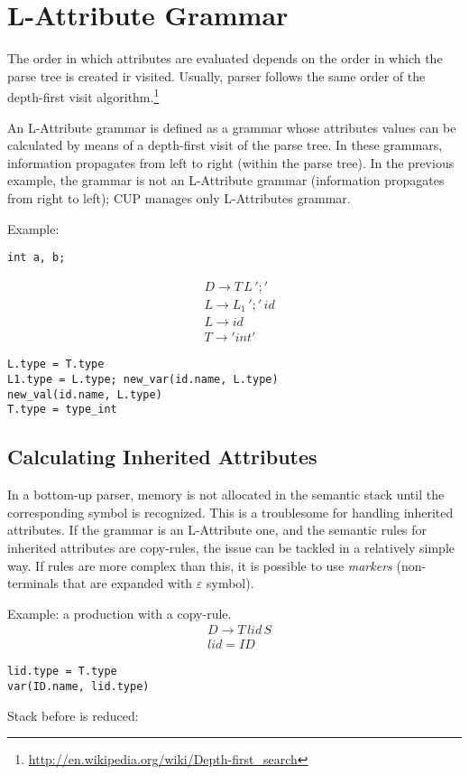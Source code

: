 \section{L-Attribute Grammar}
The order in which attributes are evaluated depends on the order in which the parse tree is created ir visited.
Usually, parser follows the same order of the depth-first visit algorithm.\footnote{\url{http://en.wikipedia.org/wiki/Depth-first_search}}

An L-Attribute grammar is defined as a grammar whose attributes values can be calculated by means of a depth-first visit of the parse tree.
In these grammars, information propagates from left to right (within the parse tree).
In the previous example, the grammar is not an L-Attribute grammar (information propagates from right to left); CUP manages only L-Attributes grammar.

Example:
\begin{lstlisting}
int a, b;
\end{lstlisting}
\begin{align*}
& D \to T \, L \, ';' \\
& L \to L_1 \, ';' \, id \\
& L \to id \\
& T \to 'int'
\end{align*}
\begin{lstlisting}
L.type = T.type
L1.type = L.type; new_var(id.name, L.type)
new_val(id.name, L.type)
T.type = type_int
\end{lstlisting}

\subsection{Calculating Inherited Attributes}
In a bottom-up parser, memory is not allocated in the semantic stack until the corresponding symbol is recognized.
This is a troublesome for handling inherited attributes.
If the grammar is an L-Attribute one, and the semantic rules for inherited attributes are copy-rules, the issue can be tackled in a relatively simple way.
If rules are more complex than this, it is possible to use \emph{markers} (non-terminals that are expanded with $\varepsilon$ symbol).

Example: a production with a copy-rule.
\begin{align*}
& D \to T \, lid \, S \\
& lid = ID
\end{align*}
\begin{lstlisting}
lid.type = T.type
var(ID.name, lid.type)
\end{lstlisting}
Stack before  is reduced:


